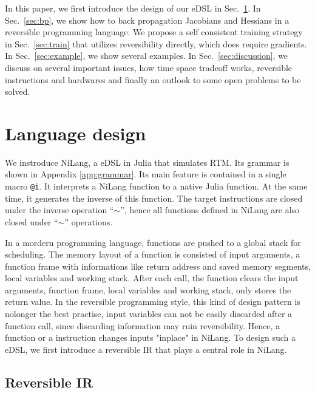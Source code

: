 \documentclass[aps,twocolumn,longbibliography,english,superscriptaddress,prr]{revtex4-1}
\newcommand{\<}{\langle}
\renewcommand{\>}{\rangle}
\newcommand{\Sec}[1]{Sec.~\ref{#1}}
\newcommand{\App}[1]{Appendix \ref{#1}}
\theoremstyle{definition}\newtheorem{definition}{\textit{Definition}}
\begin{document}
    In this paper, we first introduce the design of our eDSL in \Sec{sec:lang}.
    In \Sec{sec:bp}, we show how to back propagation Jacobians and Hessians in a reversible programming language.
    We propose a self consistent training strategy in \Sec{sec:train} that utilizes reversibility directly, which does require gradients.
    In \Sec{sec:example}, we show several examples.
    In \Sec{sec:discussion}, we discuss on several important issues, how time space tradeoff works, reversible instructions and hardwares and finally an outlook to some open problems to be solved.

    \section{Language design}\label{sec:lang}
We instroduce NiLang, a eDSL in Julia that simulates RTM. Its grammar is shown in \App{app:grammar}.
Its main feature is contained in a single macro \texttt{@i}. It interprets a NiLang function to a native Julia function.
At the same time, it generates the inverse of this function. The target instructions are closed under the inverse operation ``$\sim$'', hence all functions defined in NiLang are also closed under ``$\sim$'' operations.

    In a mordern programming language, functions are pushed to a global stack for scheduling. The memory layout of a function is consisted of input arguments, a function frame with informations like return address and saved memory segments, local variables and working stack. After each call, the function clears the input arguments, function frame, local variables and working stack, only stores the return value.
    In the reversible programming style, this kind of design pattern is nolonger the best practise, input variables can not be easily discarded after a function call, since discarding information may ruin reversibility. Hence, a function or a instruction changes inputs "inplace" in NiLang.
To design such a eDSL, we first introduce a reversible IR that plays a central role in NiLang.

\subsection{Reversible IR}
\end{document}
